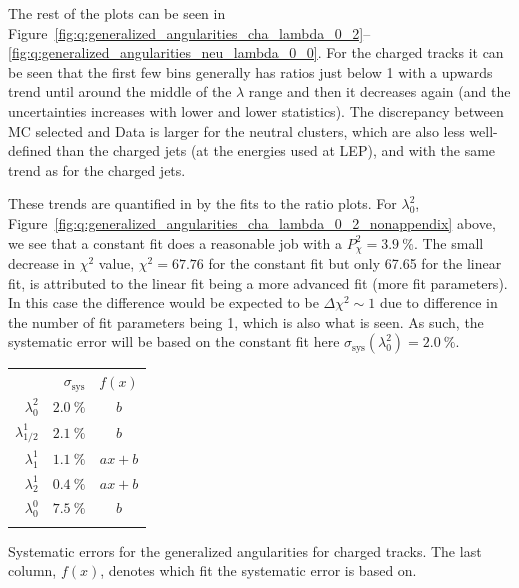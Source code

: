 The rest of the plots can be seen in Figure~\ref{fig:q:generalized_angularities_cha_lambda_0_2}--\ref{fig:q:generalized_angularities_neu_lambda_0_0}. For the charged tracks it can be seen that the first few bins generally has ratios just below \num{1} with a upwards trend until around the middle of the $\lambda$ range and then it decreases again (and the uncertainties increases with lower and lower statistics). The discrepancy between MC selected and Data is larger for the neutral clusters, which are also less well-defined than the charged jets (at the energies used at LEP), and with the same trend as for the charged jets. 

These trends are quantified in by the fits to the ratio plots. For $\lambda_0^2$, Figure~\ref{fig:q:generalized_angularities_cha_lambda_0_2_nonappendix} above, we see that a constant fit does a reasonable job with a $P_\chi^2=\SI{3.9}{\percent}$. The small decrease in $\chi^2$ value, $\chi^2 = 67.76$ for the constant fit but only \num{67.65} for the linear fit, is attributed to the linear fit being a more advanced fit (more fit parameters). In this case the difference would be expected to be $\Delta \chi^2 \sim 1$ due to difference in the number of fit parameters being \num{1}, which is also what is seen. As such, the systematic error will be based on the constant fit here $\sigma_\mathrm{sys}(\lambda_0^2)=\SI{2.0}{\percent}$. 

\begin{margintable}[-6cm]
  \centerfloat
  \begin{tabular}{@{}rrc@{}}
  {}             & $\sigma_\mathrm{sys}$ & $f(x)$ \\ \addlinespace[0.1em] \midrule \addlinespace[0.2em]
  $\lambda_0^2$        & $\SI{2.0}{\percent}$  & $b$ \\ \addlinespace[0.2em]
  $\lambda^1_{1/2}$    & $\SI{2.1}{\percent}$  & $b$ \\ \addlinespace[0.2em]
  $\lambda_1^1$        & $\SI{1.1}{\percent}$  & $ax+b$ \\ \addlinespace[0.2em]
  $\lambda_2^1$        & $\SI{0.4}{\percent}$  & $ax+b$ \\ \addlinespace[0.2em]
  $\lambda_0^0$        & $\SI{7.5}{\percent}$  & $b$ \\ \addlinespace[0.2em]
  \end{tabular}
  \vspace{3mm}
  \caption[Generalized Angularities Systematic Errors, Charged Tracks]{\label{tab:q:generalized_angularities_systematic_errors_charged}Systematic errors for the generalized angularities for charged tracks.  The last column, $f(x)$, denotes which fit the systematic error is based on.}
\end{margintable}

